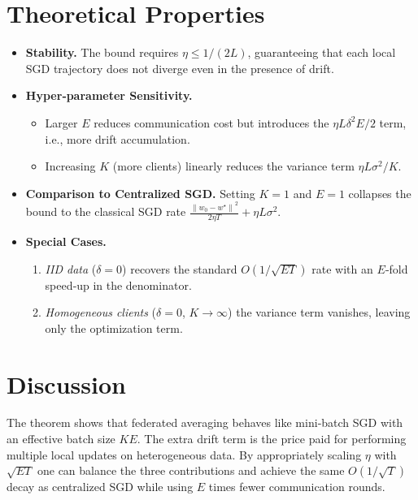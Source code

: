 \documentclass{article}
\newcommand{\norm}[1]{\left\|#1\right\|}
\begin{document}
\section*{Theoretical Properties}
\begin{itemize}[nosep]
    \item \textbf{Stability.} The bound requires $\eta\le 1/(2L)$, guaranteeing that each local SGD trajectory does not diverge even in the presence of drift.
    \item \textbf{Hyper‑parameter Sensitivity.}
    \begin{itemize}[nosep]
        \item Larger $E$ reduces communication cost but introduces the $\eta L\delta^{2}E/2$ term, i.e., more drift accumulation.
        \item Increasing $K$ (more clients) linearly reduces the variance term $\eta L\sigma^{2}/K$.
    \end{itemize}
    \item \textbf{Comparison to Centralized SGD.}
    Setting $K=1$ and $E=1$ collapses the bound to the classical SGD rate 
    $\frac{\norm{w_0-w^\star}^{2}}{2\eta T}+ \eta L\sigma^{2}$.
    \item \textbf{Special Cases.}
    \begin{enumerate}[label={\alph*.}]
        \item \emph{IID data} ($\delta=0$) recovers the standard $O(1/\sqrt{ET})$ rate with an $E$‑fold speed‑up in the denominator.
        \item \emph{Homogeneous clients} ($\delta=0$, $K\to\infty$) the variance term vanishes, leaving only the optimization term.
    \end{enumerate}
\end{itemize}

\section*{Discussion}
The theorem shows that federated averaging behaves like mini‑batch SGD with an effective batch size $K\!E$. The extra drift term is the price paid for performing multiple local updates on heterogeneous data. By appropriately scaling $\eta$ with $\sqrt{ET}$ one can balance the three contributions and achieve the same $O(1/\sqrt{T})$ decay as centralized SGD while using $E$ times fewer communication rounds.

\newpage
\end{document}
